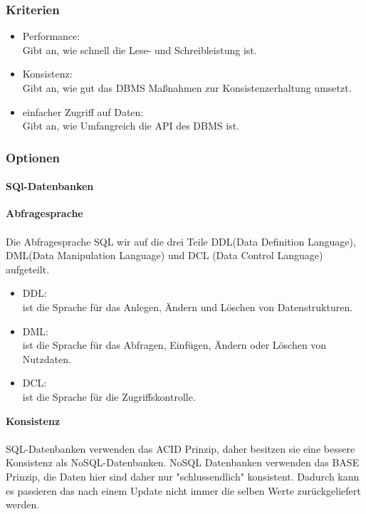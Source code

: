 \documentclass[11pt]{article}
\begin{document}
\subsubsection{Kriterien}

\begin{itemize}
	\item Performance: \\Gibt an, wie schnell die Lese- und Schreibleistung ist.
	\item Konsistenz: \\Gibt an, wie gut das DBMS Ma{\ss}nahmen zur Konsistenzerhaltung umsetzt.
	\item einfacher Zugriff auf Daten: \\Gibt an, wie Umfangreich die API des DBMS ist.
\end{itemize}

\subsubsection{Optionen}

\paragraph{SQl-Datenbanken}

\textbf{Abfragesprache}\\\\
Die Abfragesprache SQL wir auf die drei Teile DDL(Data Definition Language),
DML(Data Manipulation Language) und DCL (Data Control Language) aufgeteilt.

\begin{itemize}
	\item DDL:\\ ist die Sprache f\"ur das Anlegen, \"Andern und L\"oschen von Datenstrukturen.
	\item DML:\\ ist die Sprache f\"ur das Abfragen, Einf\"ugen, \"Andern oder L\"oschen von Nutzdaten.
	\item DCL:\\ ist die Sprache f\"ur die Zugriffskontrolle.
\end{itemize}
\textbf{Konsistenz}\\\\
SQL-Datenbanken verwenden das ACID Prinzip, daher besitzen sie eine bessere Konsistenz als
NoSQL-Datenbanken. NoSQL Datenbanken verwenden das BASE Prinzip, die Daten hier sind daher
nur "schlussendlich" konsistent. Dadurch kann es passieren das nach einem Update nicht immer
die selben Werte zur\"uckgeliefert werden.
\end{document}
